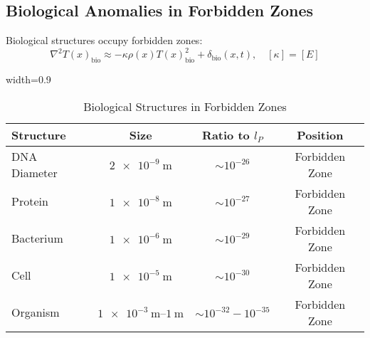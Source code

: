 \documentclass[12pt,a4paper]{article}
\newcommand{\Tfield}{T(x)}
\newcommand{\tablescale}{0.9}
\begin{document}
	\subsection{Biological Anomalies in Forbidden Zones}
	\label{sec:bio_anomalies}
	
	Biological structures occupy forbidden zones:
	\[
	\nabla^2 \Tfield_{\text{bio}} \approx -\kappa \rho(x) \Tfield_{\text{bio}}^2 + \delta_{\text{bio}}(x,t), \quad [\kappa] = [E]
	\]
	
	\begin{table}[htbp]
		\centering
		\begin{adjustbox}{width=\tablescale\textwidth}
			\begin{tabular}{lccc}
				\toprule
				\textbf{Structure} & \textbf{Size} & \textbf{Ratio to \(l_P\)} & \textbf{Position} \\
				\midrule
				DNA Diameter & \(\SI{2e-9}{\meter}\) & \(\sim 10^{-26}\) & Forbidden Zone \\
				Protein & \(\SI{1e-8}{\meter}\) & \(\sim 10^{-27}\) & Forbidden Zone \\
				Bacterium & \(\SI{1e-6}{\meter}\) & \(\sim 10^{-29}\) & Forbidden Zone \\
				Cell & \(\SI{1e-5}{\meter}\) & \(\sim 10^{-30}\) & Forbidden Zone \\
				Organism & \(\SIrange{1e-3}{1}{\meter}\) & \(\sim 10^{-32} - 10^{-35}\) & Forbidden Zone \\
				\bottomrule
			\end{tabular}
		\end{adjustbox}
		\caption{Biological Structures in Forbidden Zones}
		\label{tab:bio_anomalies}
	\end{table}
	
\end{document}
